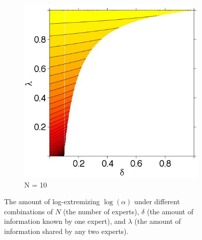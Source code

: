 \documentclass[11pt]{article}
\theoremstyle{definition}
\theoremstyle{definition}
\begin{document}
\begin{figure}
\begin{subfigure}[b]{0.49\textwidth}
                \includegraphics[width=\textwidth]{ExtremeN10.jpeg}
\caption{N = 10}
\label{ExtremeN10}
        \end{subfigure}
        \caption{ The amount of log-extremizing $\log(\alpha)$ under different combinations of $N$ (the number of experts), $\delta$ (the amount of information known by one expert), and $\lambda$ (the amount of information shared by any two experts).}
        \label{Levelplots}
\end{figure}
\end{document}
